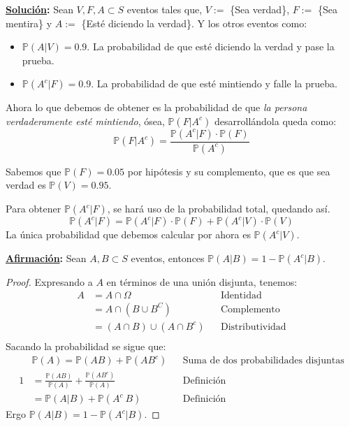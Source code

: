 \documentclass[11pt,letterpaper]{report}
\newcommand{\Pro}{\mathds{P}}
\newcommand{\sol}{\textbf{\underline{Solución}: }} %
\newcommand{\af}{\textbf{\underline{Afirmación}: }}
\begin{document}
\begin{enumerate}
\begin{itemize}
    \sol Sean $V, F, A \subset S$ eventos tales que, $V :=$ \{Sea verdad\}, $F :=$ \{Sea mentira\} y $A:=$
    \{Esté diciendo la verdad\}. Y los otros eventos como:
    \begin{itemize}
        \item $\Pro(A | V) = 0.9$. La probabilidad de que esté diciendo la verdad y pase la prueba.
        \item $\Pro(A^c | F) = 0.9$. La probabilidad de que esté mintiendo y falle la prueba.
    \end{itemize}
    Ahora lo que debemos de obtener es la probabilidad de que \emph{la persona verdaderamente esté
    mintiendo}, ósea, $\Pro(F | A^c)$ desarrollándola queda como:
    \[
        \Pro(F | A^c) = \frac{\Pro(A^c | F) \cdot \Pro(F)}{\Pro(A^c)} \tag{1}
    \]

    Sabemos que $\Pro(F) = 0.05$ por hipótesis y su complemento, que es que sea verdad es
    $\Pro(V)=0.95$.

    Para obtener $\Pro(A^c | F)$, se hará uso de la probabilidad total, quedando así.
    \[
        \Pro(A^c | F) = \Pro(A^c | F) \cdot \Pro(F) + \Pro(A^c | V) \cdot \Pro(V) \tag{2}
    \]
    La única probabilidad que debemos calcular por ahora es $\Pro(A^c | V)$.

    \af Sean $A,B \subset S$ eventos, entonces $\Pro(A | B) = 1 - \Pro(A^c | B)$.
    \begin{proof}
        Expresando a $A$ en términos de una unión disjunta, tenemos:
        \begin{align*}
            A &= A \cap \Omega && \text{Identidad}\\
                &= A \cap (B \cup B^C) && \text{Complemento}\\
                &= (A \cap B) \cup (A \cap B^c) && \text{Distributividad}\\
        \end{align*}
        Sacando la probabilidad se sigue que:
        \begin{align*}
            &\Pro(A) = \Pro(AB) + \Pro(AB^c) && \text{Suma de dos probabilidades disjuntas}\\
            1 &= \frac{\Pro(AB)}{\Pro(A)} + \frac{\Pro(AB^c)}{\Pro(A)} && \text{Definición}\\
                &= \Pro(A | B) + \Pro(A^c \ B) && \text{Definición}
        \end{align*}
        Ergo $\Pro(A | B) = 1 - \Pro(A^c | B)$.
    \end{proof}


\end{itemize}
\end{enumerate}
\end{document}
